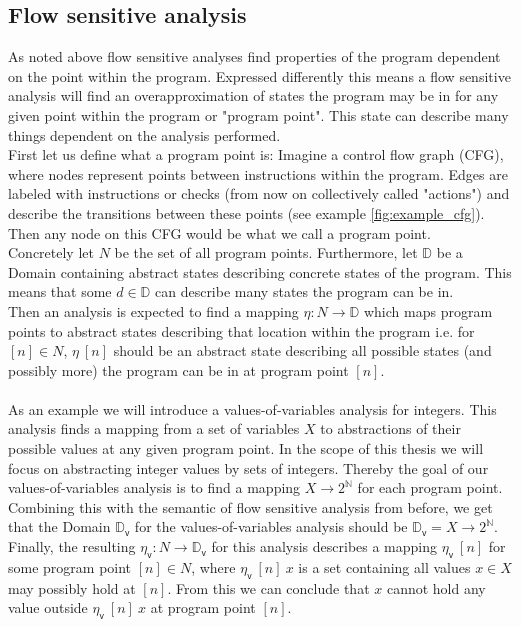     \subsection{Flow sensitive analysis}

    As noted above flow sensitive analyses find properties of the program dependent on the point within the program. Expressed differently this means a flow sensitive analysis will find an overapproximation of states the program may be in for any given point within the program or "program point". This state can describe many things dependent on the analysis performed.\\
    First let us define what a program point is: Imagine a control flow graph (CFG), where nodes represent points between instructions within the program. Edges are labeled with instructions or checks (from now on collectively called "actions") and describe the transitions between these points (see example \ref{fig:example_cfg}). Then any node on this CFG would be what we call a program point.\\
    Concretely let $N$ be the set of all program points. Furthermore, let $\mathbb{D}$ be a Domain containing abstract states describing concrete states of the program. This means that some $d \in \mathbb{D}$ can describe many states the program can be in.\\ 
    Then an analysis is expected to find a mapping $\eta: N \rightarrow \mathbb{D}$ which maps program points to abstract states describing that location within the program i.e. for $[n] \in N$, $\eta\ [n]$ should be an abstract state describing all possible states (and possibly more) the program can be in at program point $[n]$.\\
    \\
    As an example we will introduce a values-of-variables analysis for integers. This analysis finds a mapping from a set of variables $X$ to abstractions of their possible values at any given program point. In the scope of this thesis we will focus on abstracting integer values by sets of integers. Thereby the goal of our values-of-variables analysis is to find a mapping $X \rightarrow 2^\mathbb{N}$ for each program point.\\
    Combining this with the semantic of flow sensitive analysis from before, we get that the Domain $\mathbb{D}_\textsf{v}$ for the values-of-variables analysis should be $\mathbb{D}_\textsf{v} = X \rightarrow 2^\mathbb{N}$. Finally, the resulting $\eta_\textsf{v}: N \rightarrow \mathbb{D}_\textsf{v}$ for this analysis describes a mapping $\eta_\textsf{v}\ [n]$ for some program point $[n] \in N$, where $\eta_\textsf{v}\ [n]\ x$ is a set containing all values $x \in X$ may possibly hold at $[n]$. From this we can conclude that $x$ cannot hold any value outside $\eta_\textsf{v}\ [n]\ x$ at program point $[n]$.

